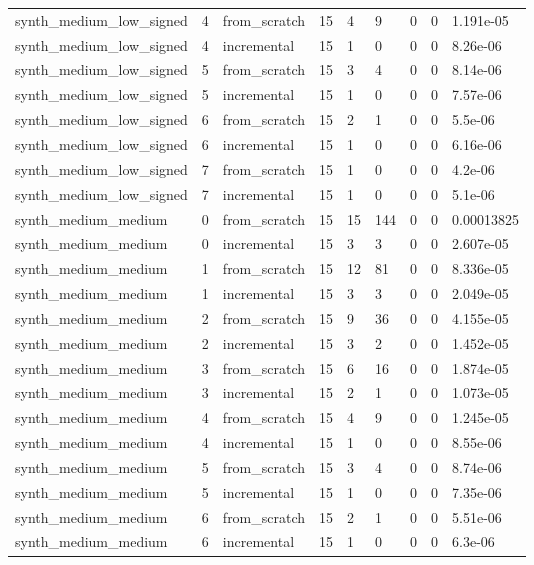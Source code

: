 \begin{table}[t]
\begin{tabular}{lllllllll}
synth\_medium\_low\_signed & 4 & from\_scratch & 15 & 4 & 9 & 0 & 0 & 1.191e-05 \\
synth\_medium\_low\_signed & 4 & incremental & 15 & 1 & 0 & 0 & 0 & 8.26e-06 \\
synth\_medium\_low\_signed & 5 & from\_scratch & 15 & 3 & 4 & 0 & 0 & 8.14e-06 \\
synth\_medium\_low\_signed & 5 & incremental & 15 & 1 & 0 & 0 & 0 & 7.57e-06 \\
synth\_medium\_low\_signed & 6 & from\_scratch & 15 & 2 & 1 & 0 & 0 & 5.5e-06 \\
synth\_medium\_low\_signed & 6 & incremental & 15 & 1 & 0 & 0 & 0 & 6.16e-06 \\
synth\_medium\_low\_signed & 7 & from\_scratch & 15 & 1 & 0 & 0 & 0 & 4.2e-06 \\
synth\_medium\_low\_signed & 7 & incremental & 15 & 1 & 0 & 0 & 0 & 5.1e-06 \\
synth\_medium\_medium & 0 & from\_scratch & 15 & 15 & 144 & 0 & 0 & 0.00013825 \\
synth\_medium\_medium & 0 & incremental & 15 & 3 & 3 & 0 & 0 & 2.607e-05 \\
synth\_medium\_medium & 1 & from\_scratch & 15 & 12 & 81 & 0 & 0 & 8.336e-05 \\
synth\_medium\_medium & 1 & incremental & 15 & 3 & 3 & 0 & 0 & 2.049e-05 \\
synth\_medium\_medium & 2 & from\_scratch & 15 & 9 & 36 & 0 & 0 & 4.155e-05 \\
synth\_medium\_medium & 2 & incremental & 15 & 3 & 2 & 0 & 0 & 1.452e-05 \\
synth\_medium\_medium & 3 & from\_scratch & 15 & 6 & 16 & 0 & 0 & 1.874e-05 \\
synth\_medium\_medium & 3 & incremental & 15 & 2 & 1 & 0 & 0 & 1.073e-05 \\
synth\_medium\_medium & 4 & from\_scratch & 15 & 4 & 9 & 0 & 0 & 1.245e-05 \\
synth\_medium\_medium & 4 & incremental & 15 & 1 & 0 & 0 & 0 & 8.55e-06 \\
synth\_medium\_medium & 5 & from\_scratch & 15 & 3 & 4 & 0 & 0 & 8.74e-06 \\
synth\_medium\_medium & 5 & incremental & 15 & 1 & 0 & 0 & 0 & 7.35e-06 \\
synth\_medium\_medium & 6 & from\_scratch & 15 & 2 & 1 & 0 & 0 & 5.51e-06 \\
synth\_medium\_medium & 6 & incremental & 15 & 1 & 0 & 0 & 0 & 6.3e-06 \\

\end{tabular}
\end{table}
